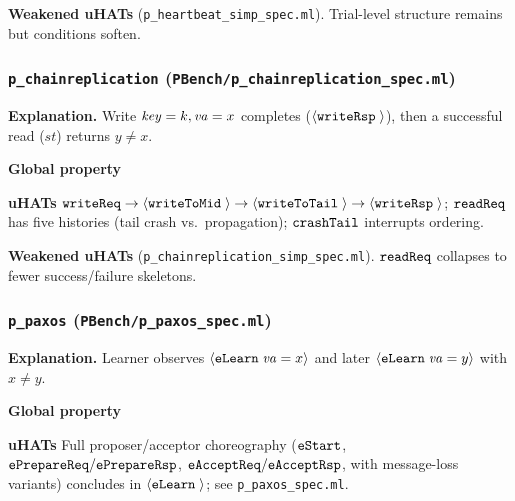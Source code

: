 \textbf{Weakened uHATs} (\texttt{p\_heartbeat\_simp\_spec.ml}).
Trial-level structure remains but conditions soften.

\subsubsection*{\texttt{p\_chainreplication} (\texttt{PBench/p\_chainreplication\_spec.ml})}
\textbf{Explanation.}
Write \(\mathit{key}=k,\mathit{va}=x\) completes (\({\langle} {\boldsymbol{{\tt writeRsp}}\;{}} {\rangle}\)), then a successful read (\(\mathit{st}\)) returns \(y\neq x\).

\textbf{Global property}
\vspace{-.35cm}\par{}
\vspace{-.4cm}\par\nobreak\noindent
\textbf{uHATs}
\(\boldsymbol{{\tt writeReq}}\rightarrow{\langle} {\boldsymbol{{\tt writeToMid}}\;{}} {\rangle}\rightarrow{\langle} {\boldsymbol{{\tt writeToTail}}\;{}} {\rangle}\rightarrow{\langle} {\boldsymbol{{\tt writeRsp}}\;{}} {\rangle}\); \(\boldsymbol{{\tt readReq}}\) has five histories (tail crash vs.\ propagation); \(\boldsymbol{{\tt crashTail}}\) interrupts ordering.

\textbf{Weakened uHATs} (\texttt{p\_chainreplication\_simp\_spec.ml}).
\(\boldsymbol{{\tt readReq}}\) collapses to fewer success/failure skeletons.

\subsubsection*{\texttt{p\_paxos} (\texttt{PBench/p\_paxos\_spec.ml})}
\textbf{Explanation.}
Learner observes \({\langle} {\boldsymbol{{\tt eLearn}}\;{\mathit{va}=x}} {\rangle}\) and later \({\langle} {\boldsymbol{{\tt eLearn}}\;{\mathit{va}=y}} {\rangle}\) with \(x\neq y\).

\textbf{Global property}
\vspace{-.35cm}\par{}
\vspace{-.4cm}\par\nobreak\noindent
\textbf{uHATs}
Full proposer/acceptor choreography (\(\boldsymbol{{\tt eStart}}\), \(\boldsymbol{{\tt ePrepareReq}}/\boldsymbol{{\tt ePrepareRsp}}\), \(\boldsymbol{{\tt eAcceptReq}}/\boldsymbol{{\tt eAcceptRsp}}\), with message-loss variants) concludes in \({\langle} {\boldsymbol{{\tt eLearn}}\;{}} {\rangle}\); see \texttt{p\_paxos\_spec.ml}.

